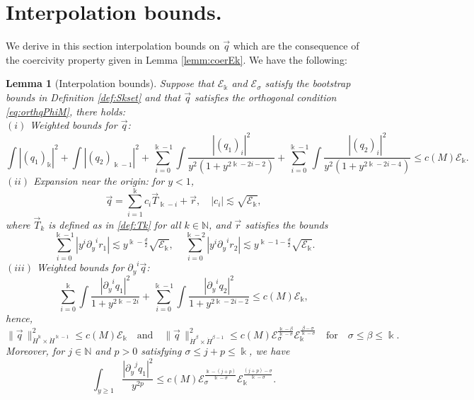 \documentclass[11pt]{aims}
\newtheorem{lemma}[theorem]{Lemma}
\theoremstyle{definition}
\numberwithin{equation}{section}
\begin{document}
\section{Interpolation bounds.}
We derive in this section interpolation bounds on $\vec q$ which are the consequence of the coercivity property given in Lemma \ref{lemm:coerEk}. We have the following:
\begin{lemma}[Interpolation bounds]\label{lemm:interbounds} Suppose that ${\mathscr{E}}_\Bbbk$ and ${\mathscr{E}}_\sigma$ satisfy the bootstrap bounds in Definition \ref{def:Skset} and that $\vec q$ satisfies the orthogonal condition \eqref{eq:orthqPhiM}, there holds:\\
$(i)$ Weighted bounds for $\vec q$:
\begin{equation}\label{eq:qmbyE2k}
\int |(q_1)_{\Bbbk}|^2 + \int|(q_2)_{\Bbbk - 1}|^2  + \sum_{i = 0}^{\Bbbk - 1}\int \frac{|(q_1)_i|^2}{y^2(1 + y^{2\Bbbk - 2i - 2})} + \sum_{i = 0}^{\Bbbk - 1}\int \frac{|(q_2)_i|^2}{y^2(1 + y^{2\Bbbk - 2i - 4})} \leq c(M) {\mathscr{E}}_{\Bbbk}.
\end{equation}
$(ii)$ Expansion near the origin: for $y < 1$,
\begin{equation}\label{eq:expqat0}
\vec q = \sum_{i = 1}^{\Bbbk}c_i\vec T_{\Bbbk - i} + \vec r, \quad |c_i| \lesssim \sqrt{{\mathscr{E}}_\Bbbk},
\end{equation}
where $\vec T_{k}$ is defined as in \eqref{def:Tk} for all $k \in \mathbb{N}$, and $\vec r$ satisfies the bounds
$$\sum_{i = 0}^{\Bbbk - 1}|y^i{\partial_y}^i r_1|  \lesssim y^{\Bbbk - \frac{d}{2}}\sqrt{{\mathscr{E}}_\Bbbk}, \quad  \sum_{i = 0}^{\Bbbk-2}|y^i{\partial_y}^i r_2|  \lesssim y^{\Bbbk - 1 - \frac{d}{2}}\sqrt{{\mathscr{E}}_\Bbbk}.$$
$(iii)$ Weighted bounds for ${\partial_y}^i \vec q$: 
\begin{equation}\label{eq:weipykq}
\sum_{i = 0}^{\Bbbk}\int \frac{|{\partial_y}^i q_1|^2}{1 + y^{2\Bbbk - 2i}} + \sum_{i = 0}^{\Bbbk - 1}\int \frac{|{\partial_y}^i q_2|^2}{1 + y^{2\Bbbk - 2i - 2}}   \leq c(M) {\mathscr{E}}_{\Bbbk},
\end{equation}
hence,
\begin{equation}\label{eq:Hkbound}
\|\vec q \,\|_{\dot{H}^\Bbbk \times \dot{H}^{\Bbbk - 1}}^2 \leq c(M){\mathscr{E}}_\Bbbk \quad \text{and} \quad \|\vec q \,\|_{\dot{H}^\beta \times \dot{H}^{\beta - 1}}^2 \leq c(M){\mathscr{E}}_\sigma^\frac{\Bbbk - \beta}{\Bbbk - \sigma}{\mathscr{E}}_\Bbbk^\frac{\beta - \sigma}{\Bbbk - \sigma} \quad \text{for} \quad \sigma \leq \beta \leq \Bbbk.
\end{equation}
Moreover, for $j \in \mathbb{N}$ and $p > 0$ satisfying $\sigma \leq j + p \leq \Bbbk$, we have
\begin{equation}\label{eq:interBound}
\int_{y \geq 1} \frac{|{\partial_y}^j q_1|^2}{y^{2p}} \leq c(M){\mathscr{E}}_\sigma^{\frac{\Bbbk - (j + p)}{\Bbbk - \sigma}}{\mathscr{E}}_\Bbbk^{\frac{(j+p) -\sigma}{\Bbbk - \sigma}}.
\end{equation}


\end{lemma}
\end{document}
